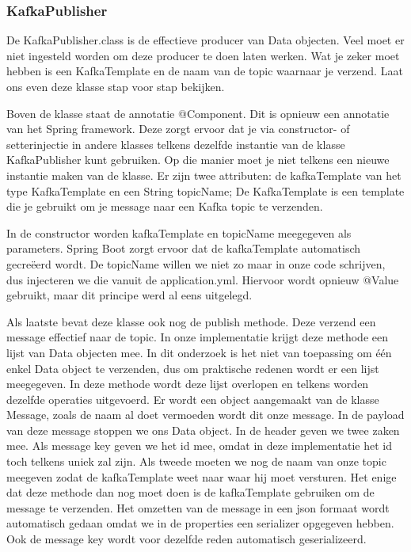     \subsubsection{KafkaPublisher}
    De KafkaPublisher.class is de effectieve producer van Data objecten. Veel moet er niet ingesteld worden om deze producer te doen laten werken. Wat je zeker moet hebben is een KafkaTemplate en de naam van de topic waarnaar je verzend. Laat ons even deze klasse stap voor stap bekijken.
    
    Boven de klasse staat de annotatie @Component. Dit is opnieuw een annotatie van het Spring framework. Deze zorgt ervoor dat je via constructor- of setterinjectie in andere klasses telkens dezelfde instantie van de klasse KafkaPublisher kunt gebruiken. Op die manier moet je niet telkens een nieuwe instantie maken van de klasse. Er zijn twee attributen: de kafkaTemplate van het type KafkaTemplate en een String topicName; De KafkaTemplate is een template die je gebruikt om je message naar een Kafka topic te verzenden.
    
    In de constructor worden kafkaTemplate en topicName meegegeven als parameters. Spring Boot zorgt ervoor dat de kafkaTemplate automatisch gecreëerd wordt. De topicName willen we niet zo maar in onze code schrijven, dus injecteren we die vanuit de application.yml. Hiervoor wordt opnieuw @Value gebruikt, maar dit principe werd al eens uitgelegd.
    
    Als laatste bevat deze klasse ook nog de publish methode. Deze verzend een message effectief naar de topic. In onze implementatie krijgt deze methode een lijst van Data objecten mee. In dit onderzoek is het niet van toepassing om één enkel Data object te verzenden, dus om praktische redenen wordt er een lijst meegegeven. In deze methode wordt deze lijst overlopen en telkens worden dezelfde operaties uitgevoerd. Er wordt een object aangemaakt van de klasse Message, zoals de naam al doet vermoeden wordt dit onze message. In de payload van deze message stoppen we ons Data object. In de header geven we twee zaken mee. Als message key geven we het id mee, omdat in deze implementatie het id toch telkens uniek zal zijn. Als tweede moeten we nog de naam van onze topic meegeven zodat de kafkaTemplate weet naar waar hij moet versturen. Het enige dat deze methode dan nog moet doen is de kafkaTemplate gebruiken om de message te verzenden. Het omzetten van de message in een json formaat wordt automatisch gedaan omdat we in de properties een serializer opgegeven hebben. Ook de message key wordt voor dezelfde reden automatisch geserializeerd. 
 
